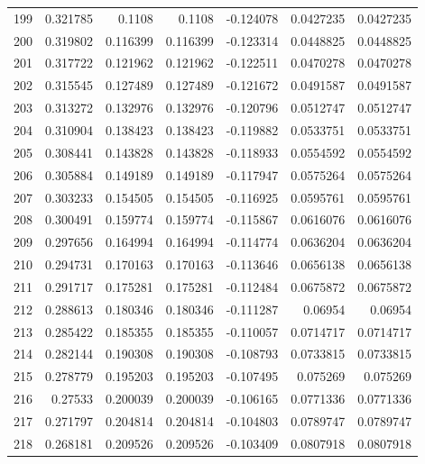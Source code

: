 \begin{tabular}{rrrrrrr}
 199 &  0.321785    & 0.1108      & 0.1108      & -0.124078    & 0.0427235   & 0.0427235   \\
 200 &  0.319802    & 0.116399    & 0.116399    & -0.123314    & 0.0448825   & 0.0448825   \\
 201 &  0.317722    & 0.121962    & 0.121962    & -0.122511    & 0.0470278   & 0.0470278   \\
 202 &  0.315545    & 0.127489    & 0.127489    & -0.121672    & 0.0491587   & 0.0491587   \\
 203 &  0.313272    & 0.132976    & 0.132976    & -0.120796    & 0.0512747   & 0.0512747   \\
 204 &  0.310904    & 0.138423    & 0.138423    & -0.119882    & 0.0533751   & 0.0533751   \\
 205 &  0.308441    & 0.143828    & 0.143828    & -0.118933    & 0.0554592   & 0.0554592   \\
 206 &  0.305884    & 0.149189    & 0.149189    & -0.117947    & 0.0575264   & 0.0575264   \\
 207 &  0.303233    & 0.154505    & 0.154505    & -0.116925    & 0.0595761   & 0.0595761   \\
 208 &  0.300491    & 0.159774    & 0.159774    & -0.115867    & 0.0616076   & 0.0616076   \\
 209 &  0.297656    & 0.164994    & 0.164994    & -0.114774    & 0.0636204   & 0.0636204   \\
 210 &  0.294731    & 0.170163    & 0.170163    & -0.113646    & 0.0656138   & 0.0656138   \\
 211 &  0.291717    & 0.175281    & 0.175281    & -0.112484    & 0.0675872   & 0.0675872   \\
 212 &  0.288613    & 0.180346    & 0.180346    & -0.111287    & 0.06954     & 0.06954     \\
 213 &  0.285422    & 0.185355    & 0.185355    & -0.110057    & 0.0714717   & 0.0714717   \\
 214 &  0.282144    & 0.190308    & 0.190308    & -0.108793    & 0.0733815   & 0.0733815   \\
 215 &  0.278779    & 0.195203    & 0.195203    & -0.107495    & 0.075269    & 0.075269    \\
 216 &  0.27533     & 0.200039    & 0.200039    & -0.106165    & 0.0771336   & 0.0771336   \\
 217 &  0.271797    & 0.204814    & 0.204814    & -0.104803    & 0.0789747   & 0.0789747   \\
 218 &  0.268181    & 0.209526    & 0.209526    & -0.103409    & 0.0807918   & 0.0807918   \\

\end{tabular}
